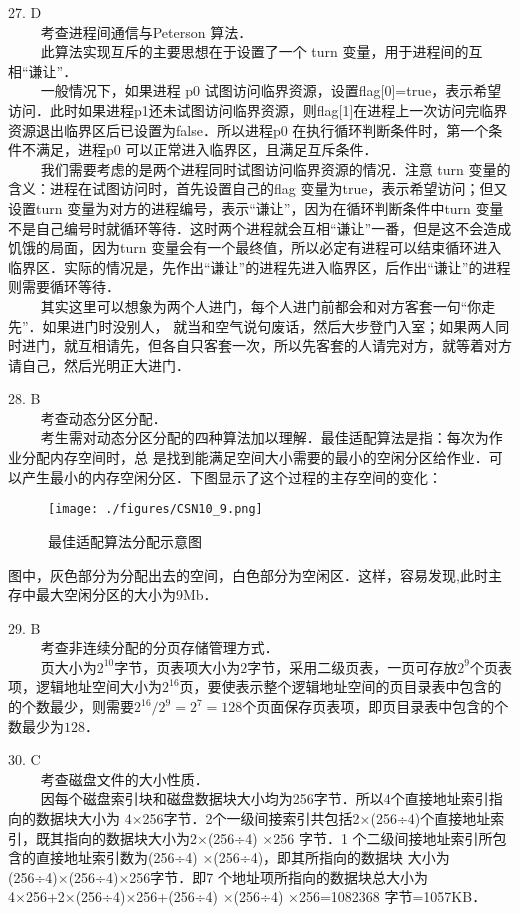 27. D \\
$\qquad$ 考查进程间通信与Peterson 算法．\\
$\qquad$ 此算法实现互斥的主要思想在于设置了一个 turn 变量，用于进程间的互相“谦让”．\\
$\qquad$ 一般情况下，如果进程 p0 试图访问临界资源，设置flag[0]=true，表示希望访问．此时如果进程p1还未试图访问临界资源，则flag[1]在进程上一次访问完临界资源退出临界区后已设置为false．所以进程p0 在执行循环判断条件时，第一个条件不满足，进程p0 可以正常进入临界区，且满足互斥条件．\\
$\qquad$ 我们需要考虑的是两个进程同时试图访问临界资源的情况．注意 turn 变量的含义：进程在试图访问时，首先设置自己的flag 变量为true，表示希望访问；但又设置turn 变量为对方的进程编号，表示“谦让”，因为在循环判断条件中turn 变量不是自己编号时就循环等待．这时两个进程就会互相“谦让”一番，但是这不会造成饥饿的局面，因为turn 变量会有一个最终值，所以必定有进程可以结束循环进入临界区．实际的情况是，先作出“谦让”的进程先进入临界区，后作出“谦让”的进程则需要循环等待．\\
$\qquad$ 其实这里可以想象为两个人进门，每个人进门前都会和对方客套一句“你走先”．如果进门时没别人，
就当和空气说句废话，然后大步登门入室；如果两人同时进门，就互相请先，但各自只客套一次，所以先客套的人请完对方，就等着对方请自己，然后光明正大进门．

28. B \\
$\qquad$ 考查动态分区分配．\\
$\qquad$ 考生需对动态分区分配的四种算法加以理解．最佳适配算法是指：每次为作业分配内存空间时，总
是找到能满足空间大小需要的最小的空闲分区给作业．可以产生最小的内存空闲分区．下图显示了这个过程的主存空间的变化：
\begin{figure}[ht]
\centering
\texttt{[image: ./figures/CSN10\_9.png]}
\caption{最佳适配算法分配示意图} \label{CSN10_fig9}
\end{figure}
图中，灰色部分为分配出去的空间，白色部分为空闲区．这样，容易发现,此时主存中最大空闲分区的大小为9Mb．

29. B \\
$\qquad$ 考查非连续分配的分页存储管理方式．\\
$\qquad$ 页大小为$2^{10}$字节，页表项大小为$2$字节，采用二级页表，一页可存放$2^9$个页表项，逻辑地址空间大小为$2^{16}$页，要使表示整个逻辑地址空间的页目录表中包含的的个数最少，则需要$2^{16}/2^9=2^7=128$个页面保存页表项，即页目录表中包含的个数最少为$128$．

30. C \\
$\qquad$ 考查磁盘文件的大小性质．\\
$\qquad$ 因每个磁盘索引块和磁盘数据块大小均为256字节．所以4个直接地址索引指向的数据块大小为
4×256字节．2个一级间接索引共包括2×(256÷4)个直接地址索引，既其指向的数据块大小为2×(256÷4)
×256 字节．1 个二级间接地址索引所包含的直接地址索引数为(256÷4) ×(256÷4)，即其所指向的数据块
大小为(256÷4)×(256÷4)×256字节．即7 个地址项所指向的数据块总大小为4×256+2×(256÷4)×256+(256÷4) ×(256÷4) ×256=1082368 字节=1057KB．

